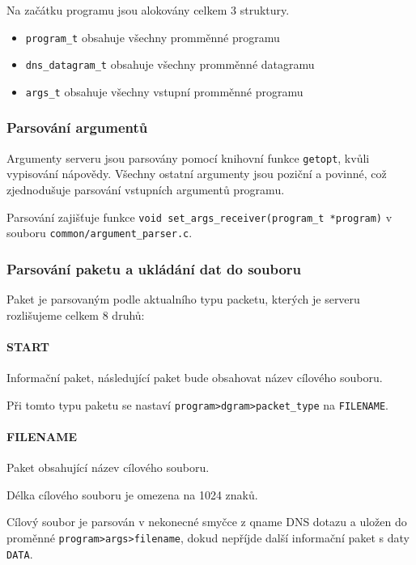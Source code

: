 Na začátku programu jsou alokovány celkem 3 struktury.

\begin{itemize}
    \item \texttt{program\_t} \- obsahuje všechny promměnné programu
    \item \texttt{dns\_datagram\_t} \- obsahuje všechny promměnné datagramu
    \item \texttt{args\_t} \- obsahuje všechny vstupní promměnné programu
\end{itemize}

\subsubsection{Parsování argumentů} \label{sec:parsovani-argumentu-s}
Argumenty serveru jsou parsovány pomocí knihovní funkce \texttt{getopt},
kvůli
vypisování nápovědy. Všechny ostatní argumenty jsou poziční a povinné,
což zjednodušuje parsování vstupních argumentů programu.

Parsování zajišťuje funkce \texttt{void set\_args\_receiver(program\_t *program)}
v souboru \texttt{common/argument\_parser.c}.

\subsubsection{Parsování paketu a ukládání dat do souboru} \label{sec:vytvareni-paketu-s}
Paket je parsovaným podle aktualního typu packetu, kterých je serveru
rozlišujeme celkem 8 druhů:

\paragraph{START}
Informační paket, následující paket bude obsahovat název cílového souboru.

Při tomto typu paketu se nastaví \texttt{program\->dgram\->packet\_type} na \texttt{FILENAME}.

\paragraph{FILENAME}
Paket obsahující název cílového souboru.

Délka cílového souboru je omezena na 1024 znaků.

Cílový soubor je parsován v nekonecné smyčce z qname DNS dotazu
a uložen do proměnné \texttt{program\->args\->filename}, dokud nepříjde
další informační paket s daty \texttt{DATA}.

